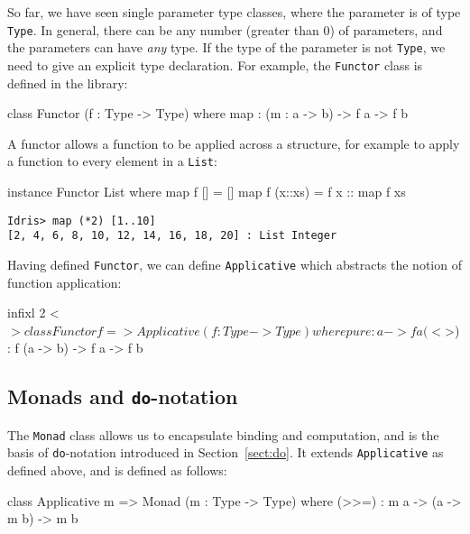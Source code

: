 \label{sec:functor}

So far, we have seen single parameter type classes, where the parameter is of
type \texttt{Type}.  In general, there can be any number (greater than 0) of
parameters, and the parameters can have \emph{any} type.  If the type of the
parameter is not \texttt{Type}, we need to give an explicit type declaration.
For example, the \texttt{Functor} class is defined in the library:

\begin{code}
class Functor (f : Type -> Type) where
    map : (m : a -> b) -> f a -> f b
\end{code}

\noindent
A functor allows a function to be applied across a structure, for example
to apply a function to every element in a \texttt{List}:

\begin{code}
instance Functor List where
  map f []      = []
  map f (x::xs) = f x :: map f xs
\end{code}

\begin{lstlisting}[style=stdout]
Idris> map (*2) [1..10]
[2, 4, 6, 8, 10, 12, 14, 16, 18, 20] : List Integer
\end{lstlisting}

\noindent
Having defined \texttt{Functor}, we can define \texttt{Applicative}
which abstracts the notion of function application:

\begin{code}
infixl 2 <$> 

class Functor f => Applicative (f : Type -> Type) where 
    pure  : a -> f a
    (<$>) : f (a -> b) -> f a -> f b 
\end{code} 

\subsection{Monads and \texttt{do}-notation}

\label{sec:monad}

The \texttt{Monad} class allows us to encapsulate binding and computation, and
is the basis of \texttt{do}-notation introduced in Section~\ref{sect:do}.
It extends \texttt{Applicative} as defined above, and is defined as
follows:

\begin{code}
class Applicative m => Monad (m : Type -> Type) where
    (>>=)  : m a -> (a -> m b) -> m b
\end{code}


